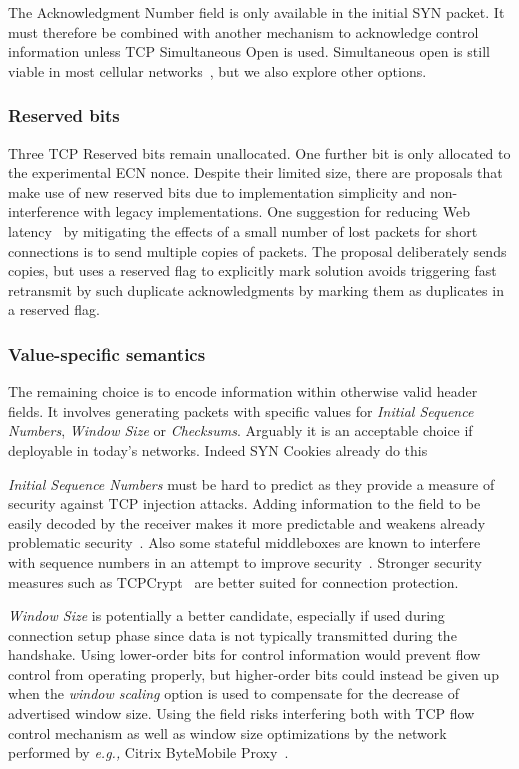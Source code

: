 \documentclass{sig-alternate-10pt}
\providecommand{\eg}{\emph{e.g.,} }
\begin{document}
The Acknowledgment Number field is only available in the initial SYN packet. It must therefore be combined with another mechanism to acknowledge control information unless TCP Simultaneous Open is used. Simultaneous open is still viable in most cellular networks~\cite{UntoldMiddlebox2011}, but we also explore other options.

\subsubsection*{Reserved bits}
\label{sec:reserved}

Three TCP Reserved bits remain unallocated. One further bit is only allocated to the experimental ECN nonce\cite{Ely:uc}. Despite their limited size, there are proposals that make use of new reserved bits due to implementation simplicity and non-interference with legacy implementations. One suggestion for reducing Web latency~\cite{Flach:2013uy} by mitigating the effects of a small number of lost packets for short connections is to send multiple copies of packets. The proposal deliberately sends copies, but uses a reserved flag to explicitly mark solution avoids triggering fast retransmit by such duplicate acknowledgments by marking them as duplicates in a reserved flag.

\subsubsection*{Value-specific semantics}

The remaining choice is to encode information within otherwise valid header fields. It involves generating packets with specific values for \emph{Initial Sequence Numbers}, \emph{Window Size} or \emph{Checksums}. Arguably it is an acceptable choice if deployable in today's networks. Indeed SYN Cookies already do this~\cite{Eddy:2007to}

\emph{Initial Sequence Numbers} must be hard to predict as they provide a measure of security against TCP injection attacks. Adding information to the field to be easily decoded by the receiver makes it more predictable and weakens already problematic security~\cite{Bellovin:uz,Qian:2012wb}. Also some stateful middleboxes are known to interfere with sequence numbers in an attempt to improve security~\cite{Qian:2012bj}. Stronger security measures such as TCPCrypt~\cite{Mazieres:uz} are better suited for connection protection.

\emph{Window Size} is potentially a better candidate, especially if used during connection setup phase since data is not typically transmitted during the handshake. Using lower-order bits for control information would prevent flow control from operating properly, but higher-order bits could instead be given up when the \emph{window scaling} option is used to compensate for the decrease of advertised window size. Using the field risks interfering both with TCP flow control mechanism as well as window size optimizations by the network~\cite{Kopparty:2002ht,Chakravorty:2003dm} performed by \eg Citrix ByteMobile Proxy~\cite{Ha:2006td}. 
\end{document}
